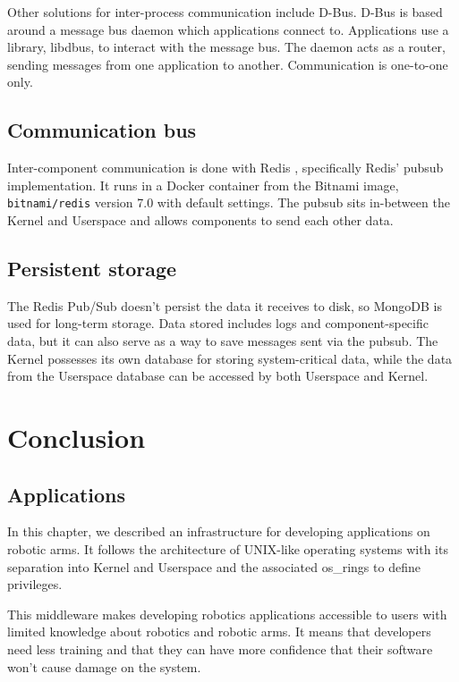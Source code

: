Other solutions for inter-process communication include D-Bus. D-Bus is based around a message bus daemon which applications connect to. Applications use a library, libdbus, to interact with the message bus. The daemon acts as a router, sending messages from one application to another. Communication is one-to-one only.


\subsection{Communication bus}

Inter-component communication is done with Redis \cite{redis}, specifically Redis' \Gls{pubsub} implementation. It runs in a Docker container from the Bitnami image, \lstinline{bitnami/redis} version 7.0 with default settings. The \Gls{pubsub} sits in-between the Kernel and Userspace and allows components to send each other data.


\subsection{Persistent storage}

The Redis Pub/Sub doesn't persist the data it receives to disk, so MongoDB is used for long-term storage. Data stored includes logs and component-specific data, but it can also serve as a way to save messages sent via the \Gls{pubsub}. The Kernel possesses its own database for storing system-critical data, while the data from the Userspace database can be accessed by both Userspace and Kernel.



\section{Conclusion}


\subsection{Applications}

In this chapter, we described an infrastructure for developing applications on robotic arms. It follows the architecture of UNIX-like operating systems with its separation into Kernel and Userspace and the associated \glspl{os_ring} to define privileges.

This middleware makes developing robotics applications accessible to users with limited knowledge about robotics and robotic arms. It means that developers need less training and that they can have more confidence that their software won't cause damage on the system.

